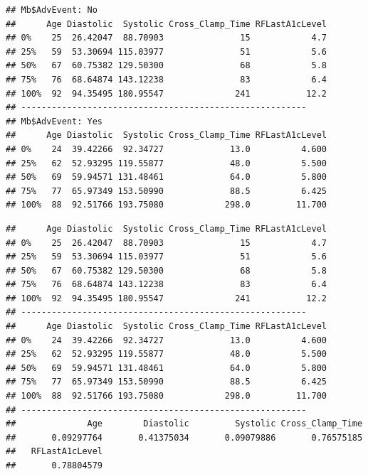 \documentclass[]{book}
\newenvironment{Shaded}{\begin{snugshade}}{\end{snugshade}}
\newcommand{\ControlFlowTok}[1]{\textcolor[rgb]{0.13,0.29,0.53}{\textbf{#1}}}
\newcommand{\DecValTok}[1]{\textcolor[rgb]{0.00,0.00,0.81}{#1}}
\newcommand{\KeywordTok}[1]{\textcolor[rgb]{0.13,0.29,0.53}{\textbf{#1}}}
\newcommand{\NormalTok}[1]{#1}
\newcommand{\OperatorTok}[1]{\textcolor[rgb]{0.81,0.36,0.00}{\textbf{#1}}}
\newcommand{\StringTok}[1]{\textcolor[rgb]{0.31,0.60,0.02}{#1}}
\begin{document}
\begin{verbatim}
## Mb$AdvEvent: No
##      Age Diastolic  Systolic Cross_Clamp_Time RFLastA1cLevel
## 0%    25  26.42047  88.70903               15            4.7
## 25%   59  53.30694 115.03977               51            5.6
## 50%   67  60.75382 129.50300               68            5.8
## 75%   76  68.64874 143.12238               83            6.4
## 100%  92  94.35495 180.95547              241           12.2
## -------------------------------------------------------- 
## Mb$AdvEvent: Yes
##      Age Diastolic  Systolic Cross_Clamp_Time RFLastA1cLevel
## 0%    24  39.42266  92.34727             13.0          4.600
## 25%   62  52.93295 119.55877             48.0          5.500
## 50%   69  59.94571 131.48461             64.0          5.800
## 75%   77  65.97349 153.50990             88.5          6.425
## 100%  88  92.51766 193.75080            298.0         11.700
\end{verbatim}

\begin{Shaded}
\end{Shaded}

\begin{verbatim}
##      Age Diastolic  Systolic Cross_Clamp_Time RFLastA1cLevel
## 0%    25  26.42047  88.70903               15            4.7
## 25%   59  53.30694 115.03977               51            5.6
## 50%   67  60.75382 129.50300               68            5.8
## 75%   76  68.64874 143.12238               83            6.4
## 100%  92  94.35495 180.95547              241           12.2
## -------------------------------------------------------- 
##      Age Diastolic  Systolic Cross_Clamp_Time RFLastA1cLevel
## 0%    24  39.42266  92.34727             13.0          4.600
## 25%   62  52.93295 119.55877             48.0          5.500
## 50%   69  59.94571 131.48461             64.0          5.800
## 75%   77  65.97349 153.50990             88.5          6.425
## 100%  88  92.51766 193.75080            298.0         11.700
## -------------------------------------------------------- 
##              Age        Diastolic         Systolic Cross_Clamp_Time 
##       0.09297764       0.41375034       0.09079886       0.76575185 
##   RFLastA1cLevel 
##       0.78804579
\end{verbatim}
\end{document}
